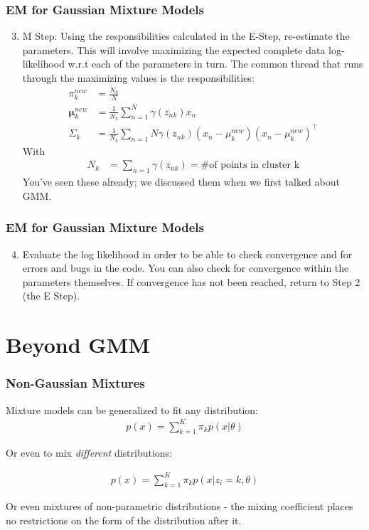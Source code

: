 \documentclass{beamer}
\begin{document}
\begin{frame}
\frametitle{EM for Gaussian Mixture Models}
\begin{enumerate}
	\setcounter{enumi}{2}
	\item M Step: Using the responsibilities calculated in the E-Step, re-estimate the parameters. This will involve maximizing the expected complete data log-likelihood w.r.t each of the parameters in turn. The common thread that runs through the maximizing values is the responsibilities:
	\begin{align}
		\pi_k^{new} &= \frac{N_k}{N}\\
		\boldsymbol{\mu}_k^{new} &= \frac{1}{N_k}\sum_{n=1}^N\gamma(z_{nk})x_n\\
		\Sigma_k &= \frac{1}{N_k} \sum_{n=1}{N} \gamma(z_{nk})(x_n - \mu_k^{new})(x_n - \mu_k^{new})^\intercal
	\end{align}
	With 
	\begin{align}
		N_k &= \sum_{n=1} \gamma({z_{nk}}) = \text{\# of points in cluster k}
	\end{align}
	You've seen these already; we discussed them when we first talked about GMM. 
\end{enumerate}
\end{frame}

\begin{frame}
\frametitle{EM for Gaussian Mixture Models}
\begin{enumerate}
	\setcounter{enumi}{3}
	\item Evaluate the log likelihood in order to be able to check convergence and for errors and bugs in the code. You can also check for convergence within the parameters themselves. If convergence has not been reached, return to Step 2 (the E Step). 
\end{enumerate}
\end{frame}



\section{Beyond GMM}

\begin{frame}
\frametitle{Non-Gaussian Mixtures}
	Mixture models can be generalized to fit any distribution:
	\begin{align*}
	p(x) = \sum_{k=1}^{K} \pi_k p (x | \theta)
	\end{align*}
	
	Or even to mix \textit{different} distributions:
	
	\begin{align*}
	p(x) = \sum_{k=1}^{K} \pi_k p (x | z_i = k, \theta)
	\end{align*}
	
	Or even mixtures of non-parametric distributions - the mixing coefficient places no restrictions on the form of the distribution after it. 

\end{frame}
\end{document}
